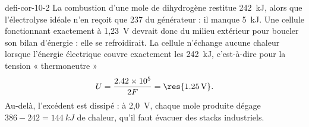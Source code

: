 \begin{blocEdition}{defi-cor-10-2}
\label{figedition-defi-cor-10-2-1}
La combustion d'une mole de dihydrogène restitue 242~kJ, alors que l'électrolyse idéale n'en reçoit que 237 du
générateur : il manque 5~kJ. Une cellule fonctionnant exactement à 1,23~V devrait donc  du milieu extérieur pour boucler son bilan d'énergie : elle se refroidirait. La cellule n'échange aucune
chaleur lorsque l'énergie électrique couvre exactement les 242~kJ, c'est-à-dire pour la tension « thermoneutre »
\[U=\frac{\num{2.42e5}}{2F}=\res{\qty{1,25}{V}}.\]
Au-delà, l'excédent est dissipé : à 2,0~V, chaque mole produite dégage $386-242=\qty{144}{kJ}$ de chaleur, qu'il faut
évacuer des stacks industriels.
\end{blocEdition}

